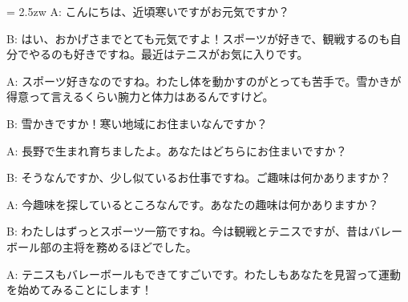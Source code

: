 \documentclass[11pt]{amsart}
\title{}
\author{}
\newenvironment{hangall}[1]{\hangindent = 2.5zw\everypar{\hangindent = 2.5zw}}{}
\begin{document}
\maketitle
\begin{hangall}{}%
A: こんにちは、近頃寒いですがお元気ですか？



B: はい、おかげさまでとても元気ですよ！スポーツが好きで、観戦するのも自分でやるのも好きですね。最近はテニスがお気に入りです。



A: スポーツ好きなのですね。わたし体を動かすのがとっても苦手で。雪かきが得意って言えるくらい腕力と体力はあるんですけど。



B: 雪かきですか！寒い地域にお住まいなんですか？



A: 長野で生まれ育ちましたよ。あなたはどちらにお住まいですか？



B: そうなんですか、少し似ているお仕事ですね。ご趣味は何かありますか？



A: 今趣味を探しているところなんです。あなたの趣味は何かありますか？



B: わたしはずっとスポーツ一筋ですね。今は観戦とテニスですが、昔はバレーボール部の主将を務めるほどでした。



A: テニスもバレーボールもできてすごいです。わたしもあなたを見習って運動を始めてみることにします！\end{hangall}
\end{document}
